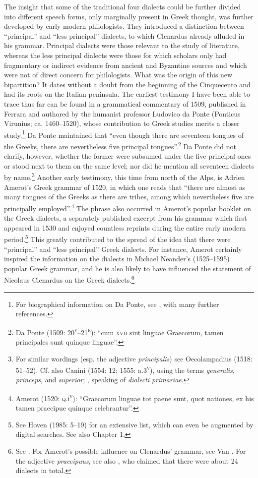 The insight that some of the traditional four dialects could be further divided into different speech forms, only marginally present in Greek thought, was further developed by early modern philologists. They introduced a distinction between “principal” and “less principal” dialects, to which Clenardus already alluded in his grammar. Principal dialects were those relevant to the study of literature, whereas the less principal dialects were those for which scholars only had fragmentary or indirect evidence from ancient and Byzantine sources and which were not of direct concern for philologists. What was the origin of this new bipartition? It dates without a doubt from the beginning of the Cinquecento and had its roots on the Italian peninsula. The earliest testimony I have been able to trace thus far can be found in a grammatical commentary of 1509, published in Ferrara and authored by the humanist professor Ludovico da Ponte (Ponticus Virunius; ca. 1460–1520), whose contribution to Greek studies merits a closer study.\footnote{For biographical information on Da Ponte, see \citet{Ricciardi1986}, with many further references.} Da Ponte maintained that “even though there are seventeen tongues of the Greeks, there are nevertheless five principal tongues”.\footnote{Da Ponte (1509: 20\textsc{\textsuperscript{v}}–21\textsc{\textsuperscript{r}}): “cum \textsc{xvii} sint linguae Graecorum, tamen principales sunt quinque linguae”.} Da Ponte did not clarify, however, whether the former were subsumed under the five principal ones or stood next to them on the same level; nor did he mention all seventeen dialects by name.\footnote{For similar wordings (esp. the adjective \textit{principalis}) see Oecolampadius (1518: 51–52). Cf. also Canini (1554: 12; 1555: a.3\textsc{\textsuperscript{v}}), using the terms \textit{generalis}, \textit{princeps}, and \textit{superior}; \citet[2]{Walper1589}, speaking of \textit{dialecti} \textit{primariae}.} Another early testimony, this time from north of the Alps, is Adrien Amerot’s Greek grammar of 1520, in which one reads that “there are almost as many tongues of the Greeks as there are tribes, among which nevertheless five are principally employed”.\footnote{Amerot (1520: \textsc{q}.i\textsc{\textsuperscript{v}}): “Graecorum linguae tot paene sunt, quot nationes, ex his tamen praecipue quinque celebrantur”.} The phrase also occurred in Amerot’s popular booklet on the Greek dialects, a separately published excerpt from his grammar which first appeared in 1530 and enjoyed countless reprints during the entire early modern period.\footnote{See Hoven (1985: 5–19) for an extensive list, which can even be augmented by digital searches. See also Chapter 1, } This greatly contributed to the spread of the idea that there were “principal” and “less principal” Greek dialects. For instance, Amerot certainly inspired the information on the dialects in Michael Neander’s (1525–1595) popular Greek grammar, and he is also likely to have influenced the statement of Nicolaus Clenardus on the Greek dialects.\footnote{See \citet[187]{Neander1553}. For Amerot’s possible influence on Clenardus’ grammar, see Van \citet{Rooy2019}. For the adjective \textit{praecipuus}, see also \citet[42]{Mosellanus1527}, who claimed that there were about 24 dialects in total.}

